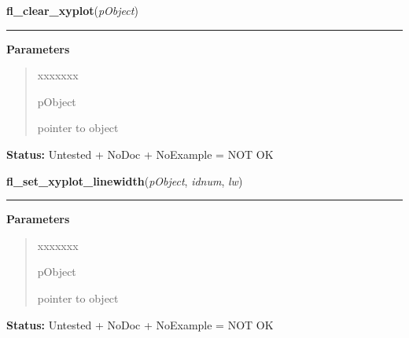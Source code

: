 \hspace{.8\funcindent}\begin{boxedminipage}{\funcwidth}

    \raggedright \textbf{fl\_clear\_xyplot}(\textit{pObject})

    \vspace{-1.5ex}

    \rule{\textwidth}{0.5\fboxrule}
\setlength{\parskip}{2ex}
\setlength{\parskip}{1ex}
      \textbf{Parameters}
      \vspace{-1ex}

      \begin{quote}
        \begin{Ventry}{xxxxxxx}

          \item[pObject]

          pointer to object

        \end{Ventry}

      \end{quote}

\textbf{Status:} Untested + NoDoc + NoExample = NOT OK



    \end{boxedminipage}

    \label{xformslib:library:fl_set_xyplot_linewidth}

    \vspace{0.5ex}

\hspace{.8\funcindent}\begin{boxedminipage}{\funcwidth}

    \raggedright \textbf{fl\_set\_xyplot\_linewidth}(\textit{pObject}, \textit{idnum}, \textit{lw})

    \vspace{-1.5ex}

    \rule{\textwidth}{0.5\fboxrule}
\setlength{\parskip}{2ex}
\setlength{\parskip}{1ex}
      \textbf{Parameters}
      \vspace{-1ex}

      \begin{quote}
        \begin{Ventry}{xxxxxxx}

          \item[pObject]

          pointer to object

        \end{Ventry}

      \end{quote}

\textbf{Status:} Untested + NoDoc + NoExample = NOT OK



    \end{boxedminipage}

